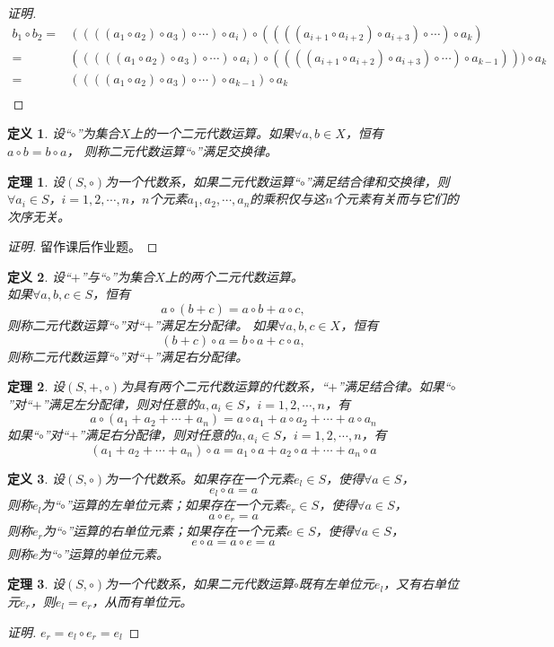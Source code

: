 \documentclass{article}
\newtheorem{Def}{定义}
\newtheorem{Thm}{定理}
\begin{document}
\begin{CJK*}{UTF8}{gbsn}
\begin{proof}[证明]
  \begin{align*}
    b_1\circ b_2 = &((((a_1\circ a_2)\circ a_3)\circ \cdots )\circ a_i)\circ ((((a_{i+1}\circ a_{i+2})\circ a_{i+3})\circ \cdots )\circ a_k)\\
                = &(((((a_1\circ a_2)\circ a_3)\circ \cdots )\circ a_i)\circ ((((a_{i+1}\circ a_{i+2})\circ a_{i+3})\circ \cdots )\circ a_{k-1})))\circ a_k\\
                =&((((a_1\circ a_2)\circ a_3)\circ \cdots )\circ a_{k-1})\circ a_k\\
  \end{align*}
\end{proof}
 \begin{Def}
    设“$\circ$”为集合$X$上的一个二元代数运算。如果$\forall a, b \in X$，恒有\\$a \circ b = b \circ a$， 则称二元代数运算“$\circ$”满足交换律。
  \end{Def}
  \begin{Thm}
    设$(S,\circ)$为一个代数系，如果二元代数运算“$\circ$”满足结合律和交换律，则$\forall a_i\in S$，$i=1,2,\cdots,n$，$n$个元素$a_1,a_2,\cdots,a_n$的乘积仅与这$n$个元素有关而与它们的次序无关。
  \end{Thm}
  \begin{proof}[证明]
留作课后作业题。    
  \end{proof}
  \begin{Def}
    设“$+$”与“$\circ$”为集合$X$上的两个二元代数运算。\\如果$\forall a, b, c \in S$，恒有\[a \circ (b + c) = a \circ b + a \circ c,\] 则称二元代数运算“$\circ$”对“$+$”满足左分配律。
    如果$\forall a, b, c \in X$，恒有\[(b + c)\circ a = b \circ a + c \circ a,\] 则称二元代数运算“$\circ$”对“$+$”满足右分配律。
  \end{Def}
  \begin{Thm}
    设$(S,+,\circ)$为具有两个二元代数运算的代数系，“$+$”满足结合律。如果“$\circ$”对“$+$”满足左分配律，则对任意的$a,a_i\in S$，$i=1,2,\cdots,n$，有
    \[a\circ (a_1+a_2+\cdots+a_n) = a\circ a_1 + a\circ a_2 + \cdots + a\circ a_n\]
    如果“$\circ$”对“$+$”满足右分配律，则对任意的$a,a_i\in S$，$i=1,2,\cdots,n$，有
    \[(a_1+a_2+\cdots+a_n)\circ a  = a_1\circ a + a_2\circ a + \cdots + a_n\circ a\]
  \end{Thm}
  \begin{Def}
    设$(S,\circ)$为一个代数系。如果存在一个元素$e_l\in S$，使得$\forall a\in S$，
    \[e_l\circ a = a\]
    则称$e_l$为“$\circ$”运算的左单位元素；如果存在一个元素$e_r\in S$，使得$\forall a\in S$，
    \[a\circ e_r = a\]
    则称$e_r$为“$\circ$”运算的右单位元素；如果存在一个元素$e\in S$，使得$\forall a\in S$，
    \[e\circ a = a\circ e = a\]
    则称$e$为“$\circ$”运算的单位元素。
  \end{Def}
  \begin{Thm}
    设$(S,\circ)$为一个代数系，如果二元代数运算$\circ$既有左单位元$e_l$，又有右单位元$e_r$，则$e_l=e_r$，从而有单位元。
  \end{Thm}
  \begin{proof}[证明]
    $e_r = e_l\circ e_r = e_l$
  \end{proof}

\end{CJK*}
\end{document}
